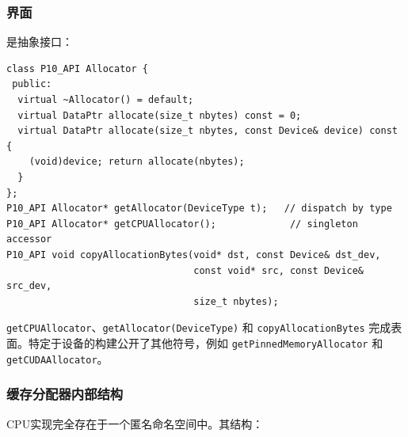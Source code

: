 \subsubsection{界面}

是抽象接口：

\begin{lstlisting}[caption={abstract surface.}, label=lst:allociface]
class P10_API Allocator {
 public:
  virtual ~Allocator() = default;
  virtual DataPtr allocate(size_t nbytes) const = 0;
  virtual DataPtr allocate(size_t nbytes, const Device& device) const {
    (void)device; return allocate(nbytes);
  }
};
P10_API Allocator* getAllocator(DeviceType t);   // dispatch by type
P10_API Allocator* getCPUAllocator();             // singleton accessor
P10_API void copyAllocationBytes(void* dst, const Device& dst_dev,
                                 const void* src, const Device& src_dev,
                                 size_t nbytes);
\end{lstlisting}

\texttt{getCPUAllocator}、\texttt{getAllocator(DeviceType)} 和 \texttt{copyAllocationBytes} 完成表面。特定于设备的构建公开了其他符号，例如 \texttt{getPinnedMemoryAllocator} 和 \texttt{getCUDAAllocator}。

\subsubsection{缓存分配器内部结构}

CPU实现完全存在于一个匿名命名空间中。其结构：

